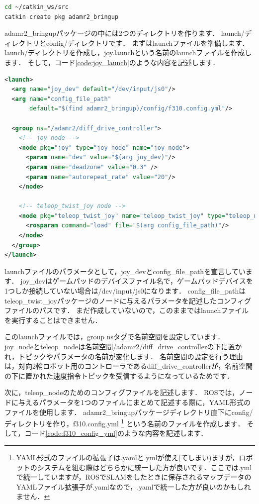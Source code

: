 \documentclass[{../../master}]{subfiles}
\begin{document}
\begin{lstlisting}[language=sh, label=code:create_adamr2_bringup, caption=Create \textsf{adamr2\_bringup} Package]
cd ~/catkin_ws/src
catkin create pkg adamr2_bringup
\end{lstlisting}

\textsf{adamr2\_bringup}パッケージの中には2つのディレクトリを作ります．
\textsf{launch/}ディレクトリと\textsf{config/}ディレクトリです．
まずはlaunchファイルを準備します．\textsf{launch/}ディレクトリを作成し，\textsf{joy.launch}という名前のlaunchファイルを作成します．
そして，コード\ref{code:joy_launch}のような内容を記述します．

\begin{lstlisting}[language=XML, label=code:joy_launch, caption=\textsf{joy.launch}]
<launch>
  <arg name="joy_dev" default="/dev/input/js0"/>
  <arg name="config_file_path"
       default="$(find adamr2_bringup)/config/f310.config.yml"/>

  <group ns="/adamr2/diff_drive_controller">
    <!-- joy node -->
    <node pkg="joy" type="joy_node" name="joy_node">
      <param name="dev" value="$(arg joy_dev)"/>
      <param name="deadzone" value="0.3" />
      <param name="autorepeat_rate" value="20"/>
    </node>

    <!-- teleop_twist_joy node -->
    <node pkg="teleop_twist_joy" name="teleop_twist_joy" type="teleop_node">
      <rosparam command="load" file="$(arg config_file_path)"/>
    </node>
  </group>
</launch>
\end{lstlisting}

launchファイルのパラメータとして，\textsf{joy\_dev}と\textsf{config\_file\_path}を宣言しています．
\textsf{joy\_dev}はゲームパッドのデバイスファイル名で，ゲームパッドデバイスを1つしか接続していない場合は\textsf{/dev/input/js0}になります．
\textsf{config\_file\_path}は\textsf{teleop\_twist\_joy}パッケージのノードに与えるパラメータを記述したコンフィグファイルのパスです．
まだ作成していないので，このままではlaunchファイルを実行することはできません．

このlaunchファイルでは，\textsf{\<group ns\>}タグで名前空間を設定しています．
\textsf{joy\_node}と\textsf{teleop\_node}は名前空間\textsf{/adamr2/diff\_drive\_controller}の下に置かれ，トピックやパラメータの名前が変化します．
名前空間の設定を行う理由は，対向2輪ロボット用のコントローラである\textsf{diff\_drive\_controller}が，名前空間の下に置かれた速度指令トピックを受信するようになっているためです．

次に，\textsf{teleop\_node}のためのコンフィグファイルを記述します．
ROSでは，ノードに与えるパラメータを1つのファイルにまとめて記述する際に，YAML形式のファイルを使用します．
\textsf{adamr2\_bringup}パッケージディレクトリ直下に\textsf{config/}ディレクトリを作り，\textsf{f310.config.yml}
\footnote{YAML形式のファイルの拡張子は\textsf{.yaml}と\textsf{.yml}が使え(てしまい)ますが，ロボットのシステムを組む際はどちらかに統一した方が良いです．ここでは\textsf{.yml}で統一していますが，ROSでSLAMをしたときに保存されるマップデータのYAMLファイル拡張子が\textsf{.yaml}なので，\textsf{.yaml}で統一した方が良いのかもしれません．}
という名前のファイルを作成します．
そして，コード\ref{code:f310_config_yml}のような内容を記述します．
\end{document}
